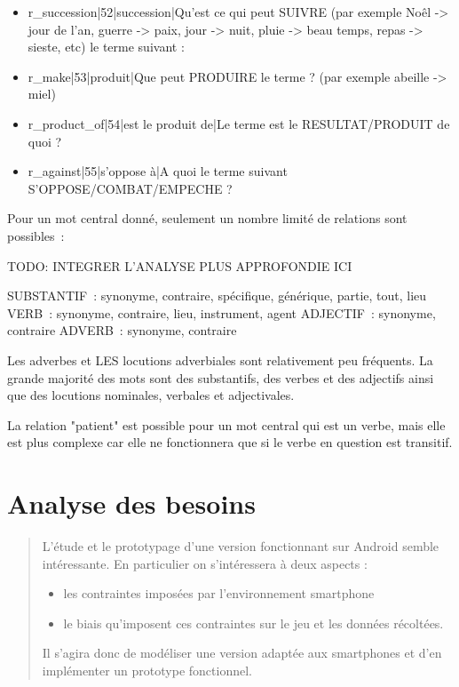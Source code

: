 \documentclass[a4paper,11pt,french]{article}
\def\android{Android\texttrademark{}}
\begin{document}
\begin{itemize}
\item r\_succession|52|succession|Qu'est ce qui peut SUIVRE (par exemple Noêl -> jour de l'an, guerre -> paix, jour -> nuit,  pluie -> beau temps, repas -> sieste, etc) le terme suivant :

\item r\_make|53|produit|Que peut PRODUIRE le terme ? (par exemple abeille -> miel)

\item r\_product\_of|54|est le produit de|Le terme est le RESULTAT/PRODUIT de quoi ?

\item r\_against|55|s'oppose à|A quoi le terme suivant S'OPPOSE/COMBAT/EMPECHE ?

\end{itemize}


Pour un mot central donné, seulement un nombre limité de relations sont possibles~:

TODO: INTEGRER L'ANALYSE PLUS APPROFONDIE ICI

SUBSTANTIF~: synonyme, contraire, spécifique, générique, partie, tout, lieu
VERB~: synonyme, contraire, lieu, instrument, agent
ADJECTIF~: synonyme, contraire
ADVERB~: synonyme, contraire

Les adverbes et LES locutions adverbiales sont relativement peu fréquents. La grande majorité des mots sont des substantifs, des verbes et des adjectifs ainsi que des locutions nominales, verbales et adjectivales. 

La relation "patient" est possible pour un mot central qui est un verbe, mais elle est plus complexe car elle ne fonctionnera que si le verbe en question est transitif. 

\section{Analyse des besoins}

\begin{quotation}
  L'étude et le prototypage d'une version fonctionnant sur \android{} semble intéressante. En particulier on s'intéressera à deux aspects :
  \begin{itemize}
  \item les contraintes imposées par l'environnement smartphone
  \item le biais qu'imposent ces contraintes sur le jeu et les données récoltées.
  \end{itemize}
  
  Il s'agira donc de modéliser une version adaptée aux smartphones et d'en implémenter un prototype fonctionnel.
\end{quotation}
\end{document}
